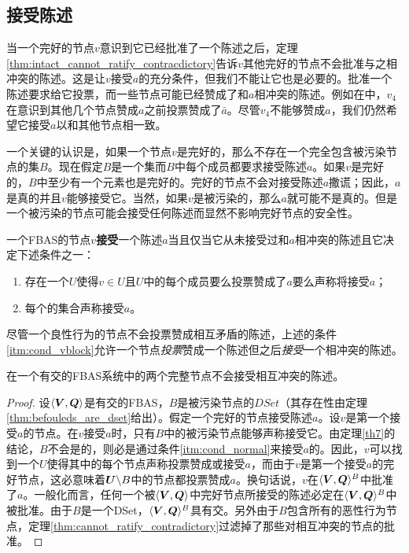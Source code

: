 \subsection{接受陈述}

当一个完好的节点$v$意识到它已经批准了一个陈述之后，定理\ref{thm:intact_cannot_ratify_contracdictory}告诉$v$其他完好的节点不会批准与之相冲突的陈述。这是让$v$接受$a$的充分条件，但我们不能让它也是必要的。批准一个陈述要求给它投票，而一些节点可能已经赞成了和$a$相冲突的陈述。例如在中，$v_4$在意识到其他几个节点赞成$a$之前投票赞成了$\bar a$。尽管$v_4$不能够赞成$a$，我们仍然希望它接受$a$以和其他节点相一致。

一个关键的认识是，如果一个节点$v$是完好的，那么不存在一个完全包含被污染节点的{\vblock}集$B$。现在假定$B$是一个{\vblock}集而$B$中每个成员都要求接受陈述$a$。如果$v$是完好的，$B$中至少有一个元素也是完好的。完好的节点不会对接受陈述$a$撒谎；因此，$a$是真的并且$v$能够接受它。当然，如果$v$是被污染的，那么$a$就可能不是真的。但是一个被污染的节点可能会接受任何陈述而显然不影响完好节点的安全性。

\begin{definition}[接受]
        一个FBAS的节点$v$\textbf{接受}一个陈述$a$当且仅当它从未接受过和$a$相冲突的陈述且它决定下述条件之一：
        \begin{enumerate}
                \item\label{itm:cond_normal} 存在一个{\quorum}$U$使得$v\in U$且$U$中的每个成员要么投票赞成了$a$要么声称将接受$a$；
                \item\label{itm:cond_vblock} 每个{\vblock}的集合声称接受$a$。 
        \end{enumerate}
\end{definition}

尽管一个良性行为的节点不会投票赞成相互矛盾的陈述，上述的条件\ref{itm:cond_vblock}允许一个节点\textit{投票}赞成一个陈述但之后\textit{接受}一个相冲突的陈述。

\begin{theorem}\label{th8}
        在一个有{\quorum}交的FBAS系统中的两个完整节点不会接受相互冲突的陈述。
\end{theorem}

\begin{proof}
        设$\langle{\bm V},{\bm Q}\rangle$是有{\quorum}交的FBAS，$B$是被污染节点的$DSet$（其存在性由定理\ref{thm:befouleds_are_dset}给出）。假定一个完好的节点接受陈述$a$。设$v$是第一个接受$a$的节点。在$v$接受$a$时，只有$B$中的被污染节点能够声称接受它。由定理\ref{th7}的结论，$B$不会是{\vblock}的，则必是通过条件\ref{itm:cond_normal}来接受$a$的。因此，$v$可以找到一个{\quorum}$U$使得其中的每个节点声称投票赞成或接受$a$，而由于$v$是第一个接受$a$的完好节点，这必意味着${\bm U}\backslash B$中的节点都投票赞成$a$。换句话说，$v$在$\langle{\bm V},{\bm Q}\rangle^{B}$中批准了$a$。一般化而言，任何一个被$\langle{\bm V},{\bm Q}\rangle$中完好节点所接受的陈述必定在$\langle{\bm V},{\bm Q}\rangle^{B}$中被批准。由于$B$是一个DSet，$\langle{\bm V},{\bm Q}\rangle^{B}$具有{\quorum}交。另外由于$B$包含所有的恶性行为节点，定理\ref{thm:cannot_ratify_contradictory}过滤掉了那些对相互冲突的节点的批准。
\end{proof}
